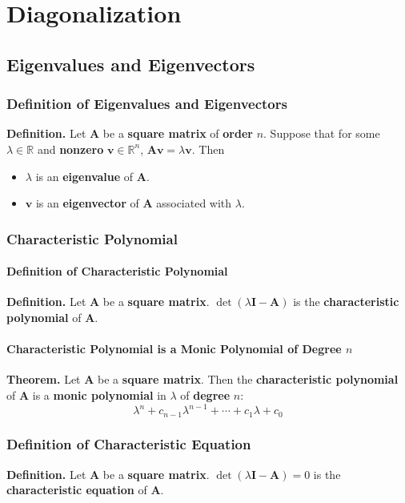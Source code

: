 \documentclass[../ma2001_notes.tex]{subfiles}
\begin{document}
\chapter{Diagonalization}
\section{Eigenvalues and Eigenvectors}
\subsection{Definition of Eigenvalues and Eigenvectors}
\textbf{Definition.} Let \(\bm{A}\) be a \textbf{square matrix} of \textbf{order} \(n\). Suppose that for some \(\lambda\in\mathbb{R}\) and \textbf{nonzero} \(\bm{v}\in\mathbb{R}^n\), \(\bm{Av}=\lambda\bm{v}\). Then
\begin{itemize}
	\item\(\lambda\) is an \textbf{eigenvalue} of \(\bm{A}\).
	\item\(\bm{v}\) is an \textbf{eigenvector} of \(\bm{A}\) associated with \(\lambda\).
\end{itemize}

\subsection{Characteristic Polynomial}
\subsubsection{Definition of Characteristic Polynomial}
\textbf{Definition.} Let \(\bm{A}\) be a \textbf{square matrix}. \(\det(\lambda\bm{I}-\bm{A})\) is the \textbf{characteristic polynomial} of \(\bm{A}\).

\subsubsection{Characteristic Polynomial is a Monic Polynomial of Degree $n$}
\textbf{Theorem.} Let \(\bm{A}\) be a \textbf{square matrix}. Then the \textbf{characteristic polynomial} of \(\bm{A}\) is a \textbf{monic polynomial} in \(\lambda\) of \textbf{degree} \(n\):
\[\lambda^n+c_{n-1}\lambda^{n-1}+\cdots+c_1\lambda+c_0\]

\subsection{Definition of Characteristic Equation}
\textbf{Definition.} Let \(\bm{A}\) be a \textbf{square matrix}. \(\det(\lambda\bm{I}-\bm{A})=0\) is the \textbf{characteristic equation} of \(\bm{A}\).
\end{document}
